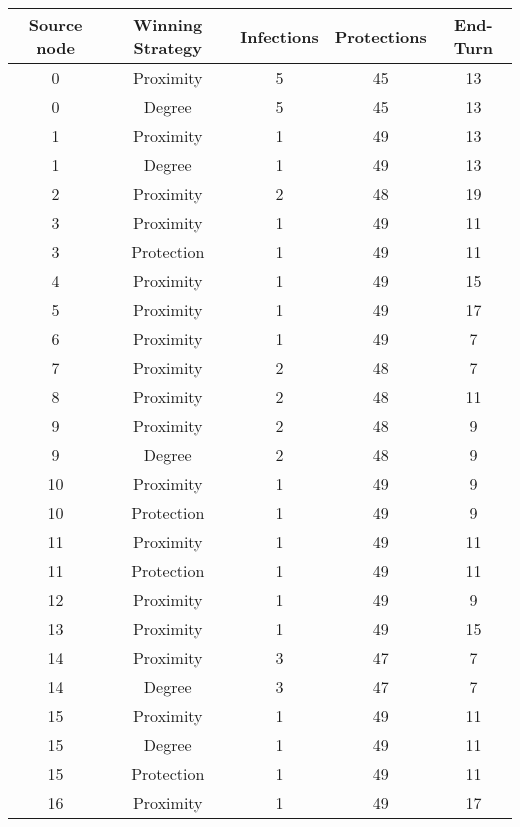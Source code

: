 \documentclass[results.tex]{subfiles}
\begin{document}
\begin{center}
  \begin{tabular}{| c || c | c | c | c |}
    \hline
    {\bfseries Source node} & {\bfseries Winning Strategy} & {\bfseries Infections} & {\bfseries Protections} & {\bfseries End-Turn} \\  %
    \hline\hline
    0 & Proximity & 5 & 45 & 13 \\ 
    \hline
    0 & Degree & 5 & 45 & 13 \\ 
    \hline
    1 & Proximity & 1 & 49 & 13 \\ 
    \hline
    1 & Degree & 1 & 49 & 13 \\ 
    \hline
    2 & Proximity & 2 & 48 & 19 \\ 
    \hline
    3 & Proximity & 1 & 49 & 11 \\ 
    \hline
    3 & Protection & 1 & 49 & 11 \\ 
    \hline
    4 & Proximity & 1 & 49 & 15 \\ 
    \hline
    5 & Proximity & 1 & 49 & 17 \\ 
    \hline
    6 & Proximity & 1 & 49 & 7 \\ 
    \hline
    7 & Proximity & 2 & 48 & 7 \\ 
    \hline
    8 & Proximity & 2 & 48 & 11 \\ 
    \hline
    9 & Proximity & 2 & 48 & 9 \\ 
    \hline
    9 & Degree & 2 & 48 & 9 \\ 
    \hline
    10 & Proximity & 1 & 49 & 9 \\ 
    \hline
    10 & Protection & 1 & 49 & 9 \\ 
    \hline
    11 & Proximity & 1 & 49 & 11 \\ 
    \hline
    11 & Protection & 1 & 49 & 11 \\ 
    \hline
    12 & Proximity & 1 & 49 & 9 \\ 
    \hline
    13 & Proximity & 1 & 49 & 15 \\ 
    \hline
    14 & Proximity & 3 & 47 & 7 \\ 
    \hline
    14 & Degree & 3 & 47 & 7 \\ 
    \hline
    15 & Proximity & 1 & 49 & 11 \\ 
    \hline
    15 & Degree & 1 & 49 & 11 \\ 
    \hline
    15 & Protection & 1 & 49 & 11 \\ 
    \hline
    16 & Proximity & 1 & 49 & 17 \\ 
    \hline

\end{tabular}
\end{center}
\end{document}
